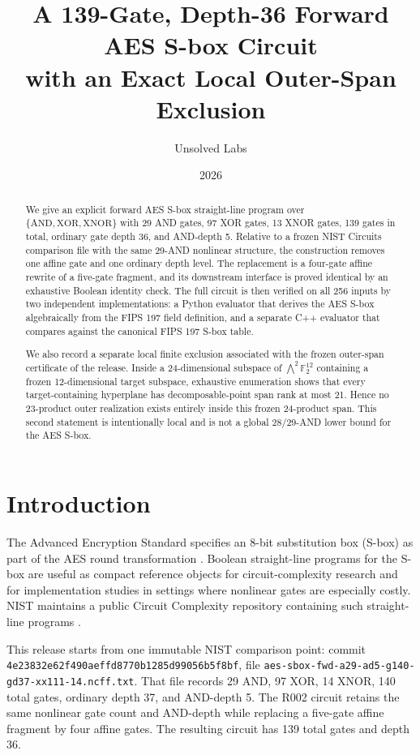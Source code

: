 \documentclass[11pt]{article}
\title{A 139-Gate, Depth-36 Forward AES S-box Circuit\\with an Exact Local Outer-Span Exclusion}
\author{Unsolved Labs}
\date{2026}
\newcommand{\F}{\mathbb{F}}
\begin{document}
\maketitle

\begin{abstract}
We give an explicit forward AES S-box straight-line program over \(\{\mathrm{AND},\mathrm{XOR},\mathrm{XNOR}\}\) with 29 AND gates, 97 XOR gates, 13 XNOR gates, 139 gates in total, ordinary gate depth 36, and AND-depth 5.  Relative to a frozen NIST Circuits comparison file with the same 29-AND nonlinear structure, the construction removes one affine gate and one ordinary depth level.  The replacement is a four-gate affine rewrite of a five-gate fragment, and its downstream interface is proved identical by an exhaustive Boolean identity check.  The full circuit is then verified on all 256 inputs by two independent implementations: a Python evaluator that derives the AES S-box algebraically from the FIPS 197 field definition, and a separate C++ evaluator that compares against the canonical FIPS 197 S-box table.

We also record a separate local finite exclusion associated with the frozen outer-span certificate of the release.  Inside a 24-dimensional subspace of \(\bigwedge^2 \F_2^{12}\) containing a frozen 12-dimensional target subspace, exhaustive enumeration shows that every target-containing hyperplane has decomposable-point span rank at most 21.  Hence no 23-product outer realization exists entirely inside this frozen 24-product span.  This second statement is intentionally local and is not a global 28/29-AND lower bound for the AES S-box.
\end{abstract}

\section{Introduction}
The Advanced Encryption Standard specifies an 8-bit substitution box (S-box) as part of the AES round transformation \cite{fips197}.  Boolean straight-line programs for the S-box are useful as compact reference objects for circuit-complexity research and for implementation studies in settings where nonlinear gates are especially costly.  NIST maintains a public Circuit Complexity repository containing such straight-line programs \cite{nistcircuits,nistproject}.

This release starts from one immutable NIST comparison point: commit
\texttt{4e23832e62f490aeffd8770b1285d99056b5f8bf}, file
\texttt{aes-sbox-fwd-a29-ad5-g140-gd37-xx111-14.ncff.txt}.  That file records 29 AND, 97 XOR, 14 XNOR, 140 total gates, ordinary depth 37, and AND-depth 5.  The R002 circuit retains the same nonlinear gate count and AND-depth while replacing a five-gate affine fragment by four affine gates.  The resulting circuit has 139 total gates and depth 36.
\end{document}
